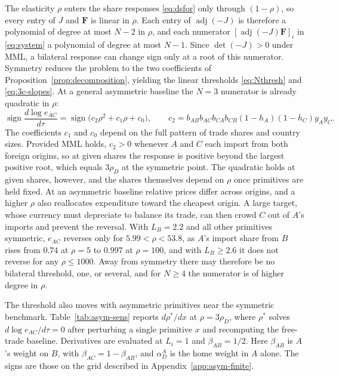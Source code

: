\documentclass[11pt]{article}
\begin{document}
The elasticity $\rho$ enters the share responses \eqref{eq:dsfor} only through $(1-\rho)$, so every entry of $J$ and $\boldsymbol{F}$ is linear in $\rho$. Each entry of $\operatorname{adj}(-J)$ is therefore a polynomial of degree at most $N-2$ in $\rho$, and each numerator $[\operatorname{adj}(-J)\boldsymbol{F}]_i$ in \eqref{eq:system} a polynomial of degree at most $N-1$. Since $\det(-J)>0$ under MML, a bilateral response can change sign only at a root of this numerator. Symmetry reduces the problem to the two coefficients of Proposition~\ref{prop:decomposition}, yielding the linear thresholds \eqref{eq:Nthresh} and \eqref{eq:3c-slopes}. At a general asymmetric baseline the $N=3$ numerator is already quadratic in $\rho$:
\begin{equation}
\operatorname{sign}\frac{d\log e_{AC}}{d\tau} = \operatorname{sign} \big( c_2\rho^2+c_1\rho+c_0 \big),
\qquad
c_2 = b_{AB}b_{AC}b_{CA}b_{CB} (1-h_A)(1-h_C)y_Ay_C.
\end{equation}
The coefficients $c_1$ and $c_0$ depend on the full pattern of trade shares and country sizes. Provided MML holds, $c_2>0$ whenever $A$ and $C$ each import from both foreign origins, so at given shares the response is positive beyond the largest positive root, which equals $3\rho_D$ at the symmetric point. The quadratic holds at given shares, however, and the shares themselves depend on $\rho$ once primitives are held fixed. At an asymmetric baseline relative prices differ across origins, and a higher $\rho$ also reallocates expenditure toward the cheapest origin. A large target, whose currency must depreciate to balance its trade, can then crowd $C$ out of $A$'s imports and prevent the reversal. With $L_B=2.2$ and all other primitives symmetric, $e_{AC}$ reverses only for $5.99<\rho<53.8$, as $A$'s import share from $B$ rises from $0.74$ at $\rho=5$ to $0.997$ at $\rho=100$, and with $L_B\geq2.6$ it does not reverse for any $\rho\leq1000$. Away from symmetry there may therefore be no bilateral threshold, one, or several, and for $N\geq4$ the numerator is of higher degree in $\rho$.

The threshold also moves with asymmetric primitives near the symmetric benchmark. Table~\ref{tab:asym-sens} reports $d\rho^\ast/dx$ at $\rho=3\rho_D$, where $\rho^\ast$ solves $d\log e_{AC}/d\tau=0$ after perturbing a single primitive $x$ and recomputing the free-trade baseline. Derivatives are evaluated at $L_i=1$ and $\beta_{AB}=1/2$. Here $\beta_{AB}$ is $A$'s weight on $B$, with $\beta_{AC}=1-\beta_{AB}$, and $\alpha_D^A$ is the home weight in $A$ alone. The signs are those on the grid described in Appendix~\ref{app:asym-finite}.
\end{document}

